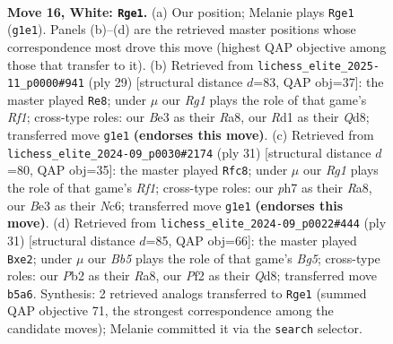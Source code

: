 \documentclass[11pt]{article}
\begin{document}
\clearpage

\begin{figure}[p]\centering
\begin{subfigure}{0.46\textwidth}\centering
\resizebox{\linewidth}{!}{%
\newchessgame
\chessboard[
  setfen={rn1k3r/ppqb2bp/3pp1p1/1B2p1Pn/4P3/2N1B3/PPP2PQP/2KR2R1 w - - 0 16},
  showmover=false,
  pgfstyle=straightmove, color=movearrow, markmove={g1-e1}
]}
\caption{}
\end{subfigure}\hfill
\begin{subfigure}{0.46\textwidth}\centering
\resizebox{\linewidth}{!}{%
\newchessgame
\chessboard[
  setfen={r2q1rk1/1pn2p1p/2p1bpp1/p7/1bPP4/3B1N1P/PP2RPP1/R1BQ2K1 b - - 2 15},
  showmover=false,
  pgfstyle=straightmove, color=movearrow, markmove={f8-e8}
]}
\caption{}
\end{subfigure}
\\[4pt]
\begin{subfigure}{0.46\textwidth}\centering
\resizebox{\linewidth}{!}{%
\newchessgame
\chessboard[
  setfen={r4rk1/1pqnbppp/2n1p1b1/p7/2Pp4/P2P1NNP/1PB1QPP1/1RB1R1K1 b - - 10 16},
  showmover=false,
  pgfstyle=straightmove, color=movearrow, markmove={f8-c8}
]}
\caption{}
\end{subfigure}\hfill
\begin{subfigure}{0.46\textwidth}\centering
\resizebox{\linewidth}{!}{%
\newchessgame
\chessboard[
  setfen={r2qr1k1/5ppp/2p2n2/p2p4/1b3Pb1/B1pPP3/P1P1BQPP/RN2R1K1 b - - 3 16},
  showmover=false,
  pgfstyle=straightmove, color=movearrow, markmove={g4-e2}
]}
\caption{}
\end{subfigure}
\caption{\textbf{Move 16, White: \texttt{Rge1}.} (a) Our position; Melanie plays \texttt{Rge1} (\texttt{g1e1}). Panels (b)--(d) are the retrieved master positions whose correspondence most drove this move (highest QAP objective among those that transfer to it). (b) Retrieved from \texttt{lichess\_elite\_2025-11\_p0000\#941} (ply 29) [structural distance $d$=83, QAP obj=37]: the master played \texttt{Re8}; under $\mu$ our \emph{Rg1} plays the role of that game's \emph{Rf1}; cross-type roles: our \emph{B}e3 as their \emph{R}a8, our \emph{R}d1 as their \emph{Q}d8; transferred move \texttt{g1e1} \textbf{(endorses this move)}. (c) Retrieved from \texttt{lichess\_elite\_2024-09\_p0030\#2174} (ply 31) [structural distance $d$=80, QAP obj=35]: the master played \texttt{Rfc8}; under $\mu$ our \emph{Rg1} plays the role of that game's \emph{Rf1}; cross-type roles: our \emph{p}h7 as their \emph{R}a8, our \emph{B}e3 as their \emph{N}c6; transferred move \texttt{g1e1} \textbf{(endorses this move)}. (d) Retrieved from \texttt{lichess\_elite\_2024-09\_p0022\#444} (ply 31) [structural distance $d$=85, QAP obj=66]: the master played \texttt{Bxe2}; under $\mu$ our \emph{Bb5} plays the role of that game's \emph{Bg5}; cross-type roles: our \emph{P}b2 as their \emph{R}a8, our \emph{P}f2 as their \emph{Q}d8; transferred move \texttt{b5a6}. Synthesis: 2 retrieved analogs transferred to \texttt{Rge1} (summed QAP objective 71, the strongest correspondence among the candidate moves); Melanie committed it via the \texttt{search} selector.}
\label{fig:thought-m30}
\end{figure}
\end{document}
